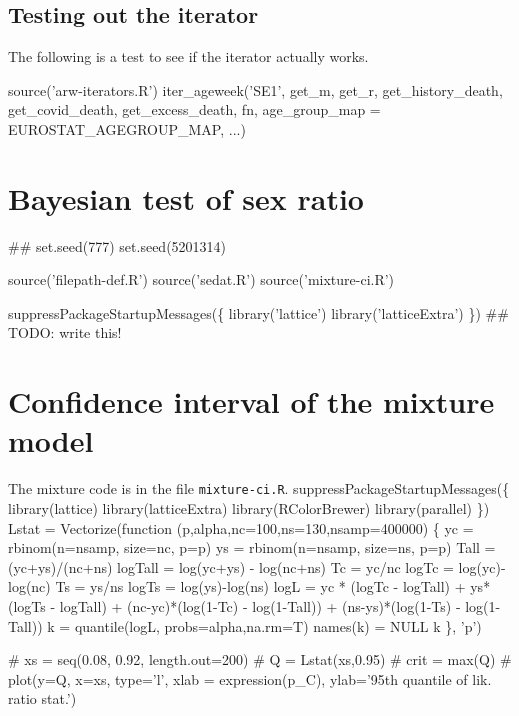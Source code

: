 \documentclass{article}
\begin{document}
\subsection{Testing out the iterator}

The following is a test to see if the iterator actually works.

\nwenddocs{}\endmoddef
source('arw-iterators.R')
iter_ageweek('SE1', get_m, get_r,
             get_history_death, get_covid_death, get_excess_death,
             fn,
             age_group_map = EUROSTAT_AGEGROUP_MAP, ...)
\nwendcode{}\nwdocspar



\section{Bayesian test of sex ratio}

\nwenddocs{}\endmoddef
## set.seed(777)
set.seed(5201314)

source('filepath-def.R')
source('sedat.R')
source('mixture-ci.R')

suppressPackageStartupMessages(\{
    library('lattice')
    library('latticeExtra')
\})
## TODO: write this!
\nwendcode{}\nwdocspar

\section{Confidence interval of the mixture model}

The mixture code is in the file {\tt{}mixture-ci.R}.
\nwenddocs{}\endmoddef
suppressPackageStartupMessages(\{
  library(lattice)
  library(latticeExtra)
  library(RColorBrewer)
  library(parallel)
\})
Lstat = Vectorize(function (p,alpha,nc=100,ns=130,nsamp=400000) \{
  yc = rbinom(n=nsamp, size=nc, p=p)
  ys = rbinom(n=nsamp, size=ns, p=p)
  Tall = (yc+ys)/(nc+ns)
  logTall = log(yc+ys) - log(nc+ns)
  Tc = yc/nc
  logTc = log(yc)-log(nc)
  Ts = ys/ns
  logTs = log(ys)-log(ns)
  logL = yc * (logTc - logTall) + ys*(logTs - logTall) +
    (nc-yc)*(log(1-Tc) - log(1-Tall)) +
    (ns-ys)*(log(1-Ts) - log(1-Tall))
  k = quantile(logL, probs=alpha,na.rm=T)
  names(k) = NULL
  k
\}, 'p')

# xs = seq(0.08, 0.92, length.out=200)
# Q = Lstat(xs,0.95)
# crit = max(Q)
# plot(y=Q, x=xs, type='l', xlab = expression(p_C), ylab='95th quantile of lik. ratio stat.')
\end{document}

